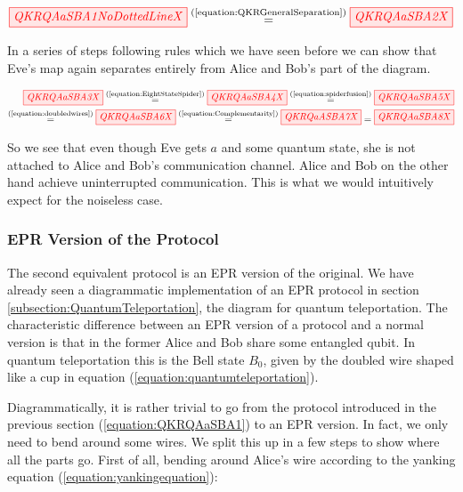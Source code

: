 \documentclass[]{article}
\newcommand{\equaltext}[1]{\ensuremath{\stackrel{\text{#1}}{=}}}
\begin{document}
\begin{equation}
	\tikzfig{QKRQAaSBA1NoDottedLineX} \equaltext{(\ref{equation:QKRGeneralSeparation})} \tikzfig{QKRQAaSBA2X}
\end{equation}

In a series of steps following rules which we have seen before we can show that Eve's map again separates entirely from Alice and Bob's part of the diagram.

\begin{equation}
	\begin{aligned}
	\tikzfig{QKRQAaSBA3X} \equaltext{(\ref{equation:EightStateSpider})} \tikzfig{QKRQAaSBA4X} \equaltext{(\ref{equation:spiderfusion})} \tikzfig{QKRQAaSBA5X} \\ \equaltext{(\ref{equation:doubledwires})} \tikzfig{QKRQAaSBA6X} \equaltext{(\ref{equation:Complementarity})} \tikzfig{QKRQaASBA7X} = \tikzfig{QKRQAaSBA8X}
	\end{aligned}
\end{equation}

So we see that even though Eve gets $a$ and some quantum state, she is not attached to Alice and Bob's communication channel. Alice and Bob on the other hand achieve uninterrupted communication. This is what we would intuitively expect for the noiseless case. 

\subsubsection{EPR Version of the Protocol}

\label{section:eprqkr}
The second equivalent protocol is an EPR version of the original. We have already seen a diagrammatic implementation of an EPR protocol in section \ref{subsection:QuantumTeleportation}, the diagram for quantum teleportation. The characteristic difference between an EPR version of a protocol and a normal version is that in the former Alice and Bob share some entangled qubit. In quantum teleportation this is the Bell state $B_0$, given by the doubled wire shaped like a cup in equation (\ref{equation:quantumteleportation}).

Diagrammatically, it is rather trivial to go from the protocol introduced in the previous section (\ref{equation:QKRQAaSBA1}) to an EPR version. In fact, we only need to bend around some wires. We split this up in a few steps to show where all the parts go. First of all, bending around Alice's wire according to the yanking equation (\ref{equation:yankingequation}):
\end{document}

